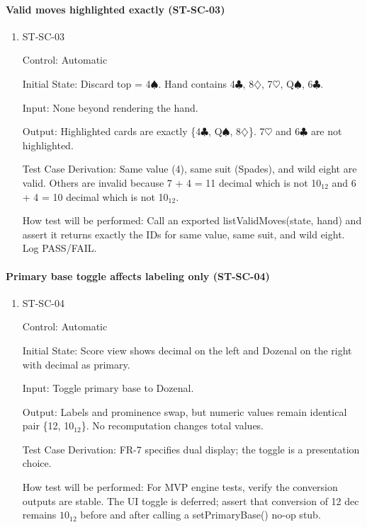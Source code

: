\documentclass[12pt, titlepage]{article}
\begin{document}
\paragraph{Valid moves highlighted exactly (ST-SC-03)}

\begin{enumerate}
\item{ST-SC-03\\}

Control: Automatic
					
Initial State: Discard top = 4$\spadesuit$. Hand contains 4$\clubsuit$, 8$\diamondsuit$, 7$\heartsuit$, Q$\spadesuit$, 6$\clubsuit$.
					
Input: None beyond rendering the hand.
					
Output: Highlighted cards are exactly \{4$\clubsuit$, Q$\spadesuit$, 8$\diamondsuit$\}. 7$\heartsuit$ and 6$\clubsuit$ are not highlighted.

Test Case Derivation: Same value (4), same suit (Spades), and wild eight are valid. Others are invalid because 7 + 4 = 11 decimal which is not 10$_{12}$ and 6 + 4 = 10 decimal which is not 10$_{12}$.

How test will be performed: Call an exported listValidMoves(state, hand) and assert it returns exactly the IDs for same value, same suit, and wild eight. Log PASS/FAIL.
\end{enumerate}

\paragraph{Primary base toggle affects labeling only (ST-SC-04)}

\begin{enumerate}
\item{ST-SC-04\\}

Control: Automatic
					
Initial State: Score view shows decimal on the left and Dozenal on the right with decimal as primary.
					
Input: Toggle primary base to Dozenal.
					
Output: Labels and prominence swap, but numeric values remain identical pair \{12, 10$_{12}$\}. No recomputation changes total values.

Test Case Derivation: FR-7 specifies dual display; the toggle is a presentation choice.

How test will be performed: For MVP engine tests, verify the conversion outputs are stable. The UI toggle is deferred; assert that conversion of 12 dec remains $10_{12}$ before and after calling a setPrimaryBase() no-op stub.
\end{enumerate}
\end{document}
